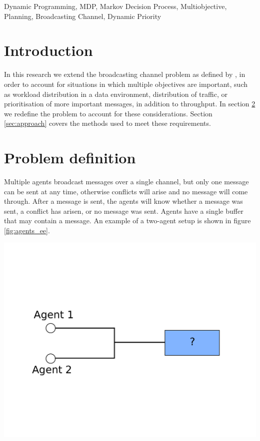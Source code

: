 \documentclass{article}
\date{}
\makeatletter
\newenvironment{figurehere}
{\def\@captype{figure}}
{}
\makeatother
\begin{document}
	\maketitle
	\begin{keywords}
		Dynamic Programming, MDP, Markov Decision Process, Multiobjective,
		Planning, Broadcasting Channel, Dynamic Priority
	\end{keywords}


	\begin{multicols}{2}

	\section{Introduction}
	\label{sec:introduction}
	In this research we extend the broadcasting channel problem as defined by
	\citet{ooi1996decentralized}, in order to account for situations in which
	multiple objectives are important, such as workload distribution in a data
	environment, distribution of traffic, or prioritisation of more important
	messages, in addition to throughput.
	In section \ref{sec:problem_definition} we redefine the problem to account
	for these considerations. Section \ref{sec:approach} covers the methods used
	to meet these requirements.

	\section{Problem definition}
	\label{sec:problem_definition}
	Multiple agents broadcast messages over a single channel, but only one
	message can be sent at any time, otherwise conflicts will arise and no
	message will come through. After a message is sent, the agents will know
	whether a message was sent, a conflict has arisen, or no message was sent.
	Agents have a single buffer that may contain a message. An example of a
	two-agent setup is shown in figure \ref{fig:agents_ee}.

	\begin{figurehere}
		\centering
		\includegraphics[scale=0.3]{images/agents_ee}
	   \label{fig:agents_ee}
	\end{figurehere}


\end{multicols}
\end{document}
